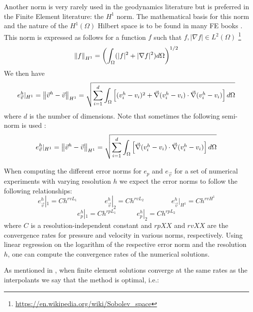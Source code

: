 Another norm is very rarely used in the geodynamics literature but is preferred in the 
Finite Element literature: the $H^1$ norm. The mathematical basis for this
norm and the nature of the $H^1(\Omega)$ Hilbert space is to be found in many FE books \cite{dohu03,john16,hugh}.
This norm is expressed as follows for a function $f$ such that $f,|\nabla f|\in L^2(\Omega)$
\footnote{\url{https://en.wikipedia.org/wiki/Sobolev_space}}
\begin{equation}
\left\lVert f\right\rVert_{H^1} = \left( \int_\Omega ( |f|^2 + |\nabla f|^2  ) d\Omega   \right)^{1/2}
\end{equation}
We then have 
\begin{equation}
e_{\vec v}^h|_{H^1} = \left\lVert\vec{v}^h-\vec{v}\right\rVert_{H^1} = \sqrt{
\sum\limits_{i=1}^d 
\int_\Omega  
\left[
({v}_i^h-{v}_i)^2
+
\vec\nabla(v_i^h-v_i)\cdot\vec\nabla(v_i^h-v_i) 
\right] d\Omega   
}
\end{equation}
where $d$ is the number of dimensions.
Note that sometimes the following semi-norm is used \cite{dobo04,bodg06}:
\begin{equation}
e_{\vec v}^h|_{H^1} = \left\lVert\vec{v}^h-\vec{v}\right\rVert_{H^1} = \sqrt{
\sum\limits_{i=1}^d 
\int_\Omega  
\left[
\vec\nabla(v_i^h-v_i)\cdot\vec\nabla(v_i^h-v_i) 
\right] d\Omega   
}
\end{equation}

When computing the different error norms for $e_p$ and $e_{\vec v}$ for a set of numerical experiments with
varying resolution $h$ we expect the error norms to follow the following relationships:
\begin{equation}
e_{\vec v}^h|_1 = C h^{rvL_1} 
\quad\quad\quad\quad
e_{\vec v}^h|_2 = C h^{rvL_2} 
\quad\quad\quad\quad 
e_{\vec v}^h|_{H^1} = C h^{rvH^1}
\end{equation}
\begin{equation}
e_p^h|_1 = C h^{rpL_1} 
\quad\quad\quad 
e_p^h|_2 = C h^{rpL_2}
\end{equation}
where $C$ is a resolution-independent constant
and $rpXX$ and $rvXX$ are the convergence rates for
pressure and velocity in various norms, respectively. 
Using linear regression on the logarithm of the respective error norm and the resolution $h$,
one can compute the convergence rates of the numerical solutions.

As mentioned in \cite{dobo04}, when finite element solutions converge at
the same rates as the interpolants we say that the method is optimal, i.e.:

